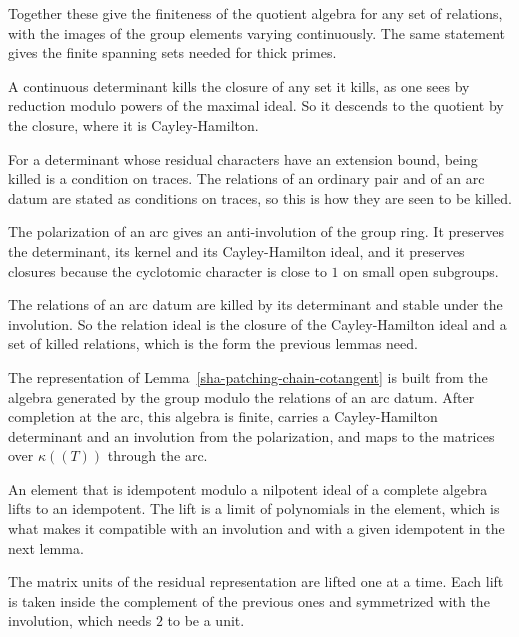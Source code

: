 Together these give the finiteness of the quotient algebra for any set of relations, with the images of the group elements varying continuously. The same statement gives the finite spanning sets needed for thick primes.

A continuous determinant kills the closure of any set it kills, as one sees by reduction modulo powers of the maximal ideal. So it descends to the quotient by the closure, where it is Cayley-Hamilton.

For a determinant whose residual characters have an extension bound, being killed is a condition on traces. The relations of an ordinary pair and of an arc datum are stated as conditions on traces, so this is how they are seen to be killed.

The polarization of an arc gives an anti-involution of the group ring. It preserves the determinant, its kernel and its Cayley-Hamilton ideal, and it preserves closures because the cyclotomic character is close to $1$ on small open subgroups.

The relations of an arc datum are killed by its determinant and stable under the involution. So the relation ideal is the closure of the Cayley-Hamilton ideal and a set of killed relations, which is the form the previous lemmas need.

The representation of Lemma~\ref{sha-patching-chain-cotangent} is built from the algebra generated by the group modulo the relations of an arc datum. After completion at the arc, this algebra is finite, carries a Cayley-Hamilton determinant and an involution from the polarization, and maps to the matrices over $\kappa((T))$ through the arc.

An element that is idempotent modulo a nilpotent ideal of a complete algebra lifts to an idempotent. The lift is a limit of polynomials in the element, which is what makes it compatible with an involution and with a given idempotent in the next lemma.

The matrix units of the residual representation are lifted one at a time. Each lift is taken inside the complement of the previous ones and symmetrized with the involution, which needs $2$ to be a unit.

